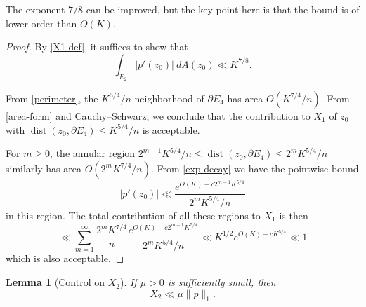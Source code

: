\documentclass[12pt]{amsart}
\newtheorem{lemma}{Lemma}[section]
\newcommand{\dist}{\operatorname{dist}}
\begin{document}
The exponent $7/8$ can be improved, but the key point here is that the bound is of lower order than $O(K)$.

\begin{proof}
By \eqref{X1-def}, it suffices to show that
$$ \int_{E_2} |p'(z_0)|\ dA(z_0) \ll K^{7/8}.$$

From \eqref{perimeter}, the $K^{5/4}/n$-neighborhood of $\partial E_4$ has area $O(K^{7/4}/n)$.  From \eqref{area-form} and Cauchy--Schwarz, we conclude that the contribution to $X_1$ of $z_0$ with $\dist(z_0, \partial E_4) \leq K^{5/4}/n$ is acceptable.

For $m \geq 0$, the annular region $2^{m-1} K^{5/4}/n \leq \dist(z_0, \partial E_4) \leq 2^m K^{5/4}/n$ similarly has area $O(2^m K^{7/4}/n)$.  From \eqref{exp-decay} we have the pointwise bound
$$ |p'(z_0)| \ll \frac{e^{O(K)-c 2^{m-1} K^{5/4}}}{2^m K^{5/4}/n} $$
in this region.
The total contribution of all these regions to $X_1$ is then
$$ \ll \sum_{m=1}^\infty \frac{2^m K^{7/4}}{n} \frac{e^{O(K)-c 2^{m-1} K^{5/4}}}{2^m K^{5/4}/n} \ll K^{1/2} e^{O(K)-c K^{5/4}} \ll 1$$
which is also acceptable.
\end{proof}

\begin{lemma}[Control on $X_2$]\label{x2-lem}
If $\mu>0$ is sufficiently small, then
$$ X_2 \ll \mu \|p\|_1.$$
\end{lemma}
\end{document}
